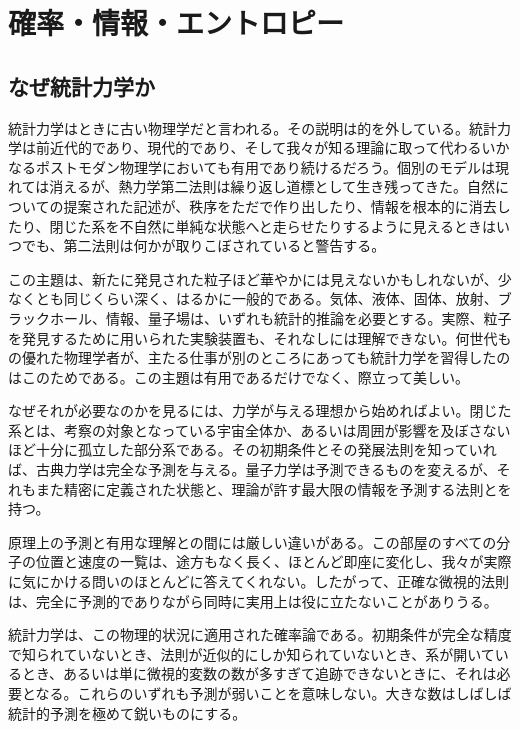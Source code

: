 \chapter{確率・情報・エントロピー}


\section{なぜ統計力学か}

統計力学はときに古い物理学だと言われる。その説明は的を外している。統計力学は前近代的であり、現代的であり、そして我々が知る理論に取って代わるいかなるポストモダン物理学においても有用であり続けるだろう。個別のモデルは現れては消えるが、熱力学第二法則は繰り返し道標として生き残ってきた。自然についての提案された記述が、秩序をただで作り出したり、情報を根本的に消去したり、閉じた系を不自然に単純な状態へと走らせたりするように見えるときはいつでも、第二法則は何かが取りこぼされていると警告する。

この主題は、新たに発見された粒子ほど華やかには見えないかもしれないが、少なくとも同じくらい深く、はるかに一般的である。気体、液体、固体、放射、ブラックホール、情報、量子場は、いずれも統計的推論を必要とする。実際、粒子を発見するために用いられた実験装置も、それなしには理解できない。何世代もの優れた物理学者が、主たる仕事が別のところにあっても統計力学を習得したのはこのためである。この主題は有用であるだけでなく、際立って美しい。

なぜそれが必要なのかを見るには、力学が与える理想から始めればよい。閉じた系とは、考察の対象となっている宇宙全体か、あるいは周囲が影響を及ぼさないほど十分に孤立した部分系である。その初期条件とその発展法則を知っていれば、古典力学は完全な予測を与える。量子力学は予測できるものを変えるが、それもまた精密に定義された状態と、理論が許す最大限の情報を予測する法則とを持つ。

原理上の予測と有用な理解との間には厳しい違いがある。この部屋のすべての分子の位置と速度の一覧は、途方もなく長く、ほとんど即座に変化し、我々が実際に気にかける問いのほとんどに答えてくれない。したがって、正確な微視的法則は、完全に予測的でありながら同時に実用上は役に立たないことがありうる。

統計力学は、この物理的状況に適用された確率論である。初期条件が完全な精度で知られていないとき、法則が近似的にしか知られていないとき、系が開いているとき、あるいは単に微視的変数の数が多すぎて追跡できないときに、それは必要となる。これらのいずれも予測が弱いことを意味しない。大きな数はしばしば統計的予測を極めて鋭いものにする。

